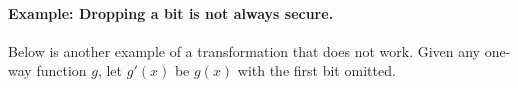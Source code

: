 \documentclass[12pt]{tufte-book}
\begin{document}


\paragraph{Example: Dropping a bit is not always secure.}
Below is another example of a transformation that does not work. Given any one-way function $g$, let $g'(x)$ be $g(x)$ with the first bit omitted.
\end{document}
